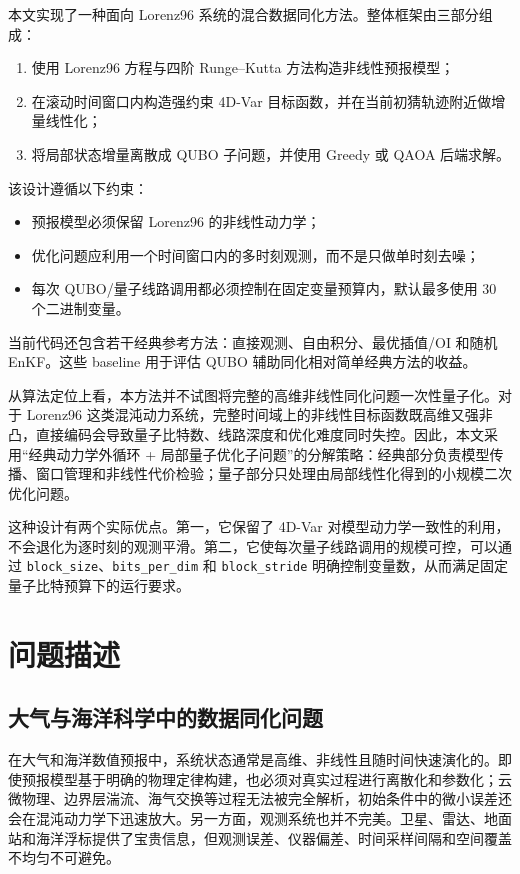 \documentclass[UTF8,a4paper,12pt]{ctexart}
\begin{document}
本文实现了一种面向 Lorenz96 系统的混合数据同化方法。整体框架由三部分组成：

\begin{enumerate}
  \item 使用 Lorenz96 方程与四阶 Runge--Kutta 方法构造非线性预报模型；
  \item 在滚动时间窗口内构造强约束 4D-Var 目标函数，并在当前初猜轨迹附近做增量线性化；
  \item 将局部状态增量离散成 QUBO 子问题，并使用 Greedy 或 QAOA 后端求解。
\end{enumerate}

该设计遵循以下约束：

\begin{itemize}
  \item 预报模型必须保留 Lorenz96 的非线性动力学；
  \item 优化问题应利用一个时间窗口内的多时刻观测，而不是只做单时刻去噪；
  \item 每次 QUBO/量子线路调用都必须控制在固定变量预算内，默认最多使用 30 个二进制变量。
\end{itemize}

当前代码还包含若干经典参考方法：直接观测、自由积分、最优插值/OI 和随机 EnKF。这些 baseline 用于评估 QUBO 辅助同化相对简单经典方法的收益。

从算法定位上看，本方法并不试图将完整的高维非线性同化问题一次性量子化。对于 Lorenz96 这类混沌动力系统，完整时间域上的非线性目标函数既高维又强非凸，直接编码会导致量子比特数、线路深度和优化难度同时失控。因此，本文采用“经典动力学外循环 + 局部量子优化子问题”的分解策略：经典部分负责模型传播、窗口管理和非线性代价检验；量子部分只处理由局部线性化得到的小规模二次优化问题。

这种设计有两个实际优点。第一，它保留了 4D-Var 对模型动力学一致性的利用，不会退化为逐时刻的观测平滑。第二，它使每次量子线路调用的规模可控，可以通过 \texttt{block\_size}、\texttt{bits\_per\_dim} 和 \texttt{block\_stride} 明确控制变量数，从而满足固定量子比特预算下的运行要求。

\section{问题描述}
\subsection{大气与海洋科学中的数据同化问题}

在大气和海洋数值预报中，系统状态通常是高维、非线性且随时间快速演化的。即使预报模型基于明确的物理定律构建，也必须对真实过程进行离散化和参数化；云微物理、边界层湍流、海气交换等过程无法被完全解析，初始条件中的微小误差还会在混沌动力学下迅速放大。另一方面，观测系统也并不完美。卫星、雷达、地面站和海洋浮标提供了宝贵信息，但观测误差、仪器偏差、时间采样间隔和空间覆盖不均匀不可避免。
\end{document}
